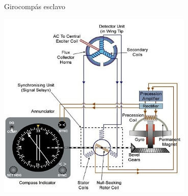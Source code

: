 \begin{frame}{Girocomp\'as esclavo}
  
\includegraphics[width=0.7\textwidth]{05.instrumentos.giroscopicos.imagenes/05.05.DGI/05-05-girocompas_esclavo.jpg}

\end{frame}


  







